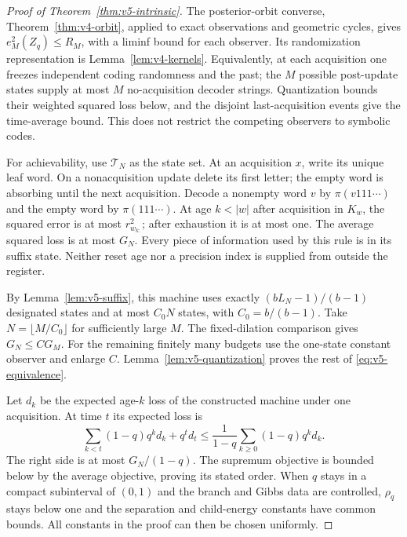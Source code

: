 \begin{proof}[Proof of Theorem~\ref{thm:v5-intrinsic}]
The posterior-orbit converse, Theorem~\ref{thm:v4-orbit}, applied
to exact observations and geometric cycles, gives
$e_M^2(Z_q)\le R_M$, with a liminf bound for each observer.
Its randomization representation is Lemma~\ref{lem:v4-kernels}.
Equivalently, at each acquisition one freezes independent coding
randomness and the past; the $M$ possible post-update states
supply at most $M$ no-acquisition decoder strings. Quantization
bounds their weighted squared loss below, and the disjoint
last-acquisition events give the time-average bound. This does
not restrict the competing observers to symbolic codes.

For achievability, use $\mathcal T_N$ as the state set. At an acquisition $x$, write its unique leaf word.
On a nonacquisition update delete its first letter; the empty
word is absorbing until the next acquisition. Decode a nonempty
word $v$ by $\pi(v111\cdots)$ and the empty word by
$\pi(111\cdots)$. At age $k<|w|$ after acquisition in $K_w$,
the squared error is at most $r_{w_{k:}}^2$; after exhaustion it
is at most one. The average squared loss is at most $G_N$.
Every piece of information used by this rule is in its suffix
state. Neither reset age nor a precision index is supplied from
outside the register.

By Lemma~\ref{lem:v5-suffix}, this machine uses exactly
$(bL_N-1)/(b-1)$ designated states and at most $C_0N$ states, with
$C_0=b/(b-1)$. Take $N=\lfloor M/C_0\rfloor$ for sufficiently large $M$.
The fixed-dilation comparison gives $G_N\le CG_M$. For the
remaining finitely many budgets use the one-state constant
observer and enlarge $C$. Lemma~\ref{lem:v5-quantization} proves
the rest of \eqref{eq:v5-equivalence}.

Let $d_k$ be the expected age-$k$ loss of the constructed machine
under one acquisition. At time $t$ its expected loss is
\[
 \sum_{k<t}(1-q)q^kd_k+q^td_t
 \le\frac{1}{1-q}\sum_{k\ge0}(1-q)q^kd_k.
\]
The right side is at most $G_N/(1-q)$. The supremum objective
is bounded below by the average objective, proving its stated
order. When $q$ stays in a compact subinterval of $(0,1)$ and the
branch and Gibbs data are controlled, $\rho_q$ stays below one
and the separation and child-energy constants have common bounds.
All constants in the proof can then be chosen uniformly.
\end{proof}
